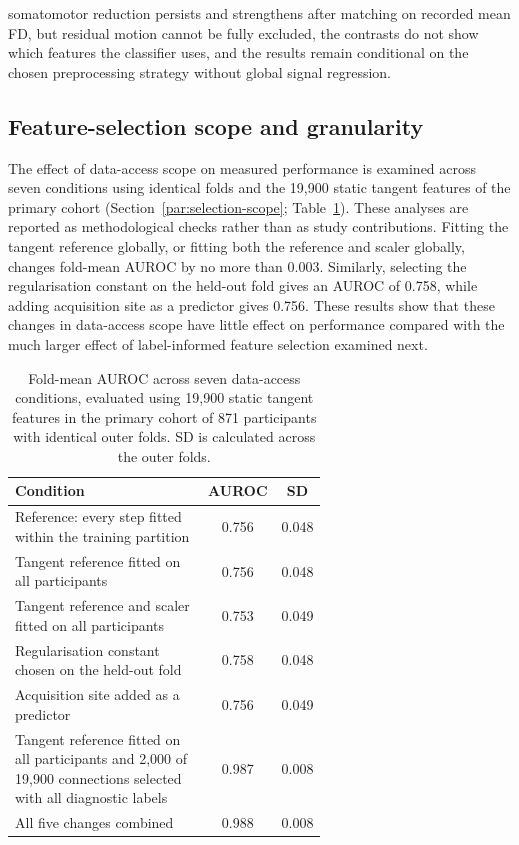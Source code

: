 somatomotor reduction persists and strengthens after matching on recorded mean FD, but residual motion cannot be fully excluded, the contrasts do not show which features the classifier uses, and the results remain conditional on the chosen preprocessing strategy without global signal regression.

\subsection{Feature-selection scope and granularity}
\label{subsec:results-selection-scope}

The effect of data-access scope on measured performance is examined across seven conditions using identical folds and the 19,900 static tangent features of the primary cohort (Section~\ref{par:selection-scope}; Table~\ref{tab:selection-scope}). These analyses are reported as methodological checks rather than as study contributions. Fitting the tangent reference globally, or fitting both the reference and scaler globally, changes fold-mean AUROC by no more than 0.003. Similarly, selecting the regularisation constant on the held-out fold gives an AUROC of 0.758, while adding acquisition site as a predictor gives 0.756. These results show that these changes in data-access scope have little effect on performance compared with the much larger effect of label-informed feature selection examined next.

\begin{table}[t]
\centering
\caption{Fold-mean AUROC across seven data-access conditions, evaluated using 19,900 static tangent features in the primary cohort of 871 participants with identical outer folds. SD is calculated across the outer folds.}
\label{tab:selection-scope}
\small
\begin{tabular}{@{}>{\raggedright\arraybackslash}p{0.62\linewidth}cc@{}}
\toprule
Condition & AUROC & SD \\
\midrule
Reference: every step fitted within the training partition & 0.756 & 0.048 \\
Tangent reference fitted on all participants & 0.756 & 0.048 \\
Tangent reference and scaler fitted on all participants & 0.753 & 0.049 \\
Regularisation constant chosen on the held-out fold & 0.758 & 0.048 \\
Acquisition site added as a predictor & 0.756 & 0.049 \\
Tangent reference fitted on all participants and 2,000 of 19,900 connections selected with all diagnostic labels & 0.987 & 0.008 \\
All five changes combined & 0.988 & 0.008 \\
\bottomrule
\end{tabular}
\end{table}

